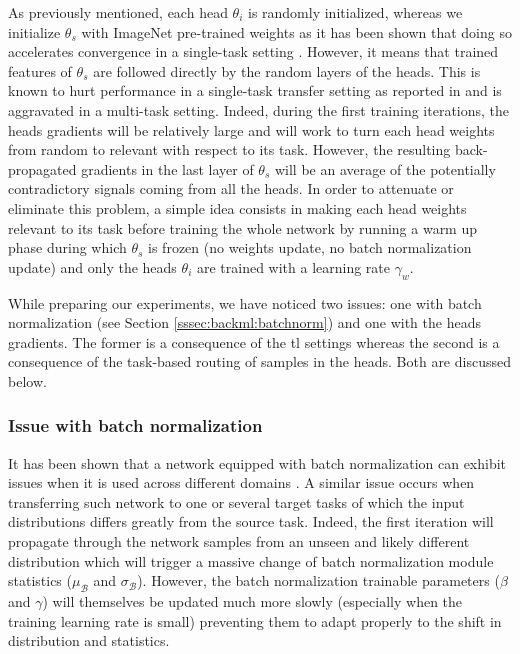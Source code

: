 As previously mentioned, each head $\theta_i$ is randomly initialized, whereas we initialize $\theta_s$ with ImageNet pre-trained weights as it has been shown that doing so accelerates convergence in a single-task setting \cite{mormont2018comparison}. However, it means that trained features of $\theta_s$ are followed directly by the random layers of the heads. This is known to hurt performance in a single-task transfer setting as reported in \citeauthor{yosinski2014transferable} \cite{yosinski2014transferable} and is aggravated in a multi-task setting. Indeed, during the first training iterations, the heads gradients will be relatively large and will work to turn each head weights from random to relevant with respect to its task. However, the resulting back-propagated gradients in the last layer of $\theta_s$ will be an average of the potentially contradictory signals coming from all the heads. In order to attenuate or eliminate this problem, a simple idea consists in making each head weights relevant to its task before training the whole network by running a warm up phase during which $\theta_s$ is frozen (\ie no weights update, no batch normalization update) and only the heads $\theta_i$ are trained with a learning rate $\gamma_w$. 

While preparing our experiments, we have noticed two issues: one with batch normalization (see Section \ref{sssec:backml:batchnorm}) and one with the heads gradients. The former is a consequence of the \acrlong{tl} settings whereas the second is a consequence of the task-based routing of samples in the heads. Both are discussed below.

\subsubsection{Issue with batch normalization} 
\label{sssec:mtask:batchnormissue}

It has been shown that a network equipped with batch normalization can exhibit issues when it is used across different domains \cite{li2018adaptive, chang2019domain}. A similar issue occurs when transferring such network to one or several target tasks of which the input distributions differs greatly from the source task. Indeed, the first iteration will propagate through the network samples from an unseen and likely different distribution which will trigger a massive change of batch normalization module statistics ($\mu_\mathcal{B}$ and $\sigma_\mathcal{B}$). However, the batch normalization trainable parameters ($\beta$ and $\gamma$) will themselves be updated much more slowly (especially when the training learning rate is small) preventing them to adapt properly to the shift in distribution and statistics. 

